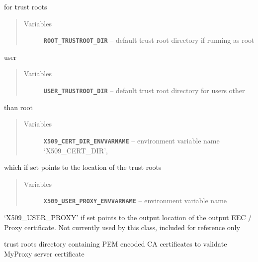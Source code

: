 \documentclass[letterpaper,10pt,english]{sphinxmanual}
\begin{document}
\begin{fulllineitems}
\begin{quote}
\begin{description}
\end{description}\end{quote}

for trust roots
\begin{quote}\begin{description}
\item[{Variables}] \leavevmode
\textbf{\texttt{ROOT\_TRUSTROOT\_DIR}} -- default trust root directory if running as root

\end{description}\end{quote}

user
\begin{quote}\begin{description}
\item[{Variables}] \leavevmode
\textbf{\texttt{USER\_TRUSTROOT\_DIR}} -- default trust root directory for users other

\end{description}\end{quote}

than root
\begin{quote}\begin{description}
\item[{Variables}] \leavevmode
\textbf{\texttt{X509\_CERT\_DIR\_ENVVARNAME}} -- environment variable name `X509\_CERT\_DIR',

\end{description}\end{quote}

which if set points to the location of the trust roots
\begin{quote}\begin{description}
\item[{Variables}] \leavevmode
\textbf{\texttt{X509\_USER\_PROXY\_ENVVARNAME}} -- environment variable name

\end{description}\end{quote}

`X509\_USER\_PROXY' if set points to the output location of the output EEC /
Proxy certificate.  Not currently used by this class, included for
reference only

\begin{fulllineitems}
\label{client:myproxy.client.MyProxyClient.caCertDir}
trust roots directory containing PEM encoded CA certificates to validate MyProxy server certificate


\end{fulllineitems}
\end{fulllineitems}
\end{document}

